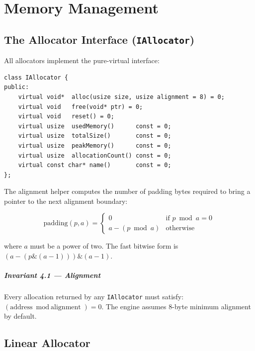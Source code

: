 \chapter{Memory Management}

\section{The Allocator Interface (\texttt{IAllocator})}

All allocators implement the pure-virtual interface:

\begin{lstlisting}[caption={IAllocator interface}]
class IAllocator {
public:
    virtual void*  alloc(usize size, usize alignment = 8) = 0;
    virtual void   free(void* ptr) = 0;
    virtual void   reset() = 0;
    virtual usize  usedMemory()      const = 0;
    virtual usize  totalSize()       const = 0;
    virtual usize  peakMemory()      const = 0;
    virtual usize  allocationCount() const = 0;
    virtual const char* name()       const = 0;
};
\end{lstlisting}

The alignment helper computes the number of padding bytes required to
bring a pointer to the next alignment boundary:

\begin{equation}
\text{padding}(p, a) =
\begin{cases}
  0 & \text{if } p \bmod a = 0 \\
  a - (p \bmod a) & \text{otherwise}
\end{cases}
\end{equation}

where $a$ must be a power of two. The fast bitwise form is
$(a - (p \mathbin{\&} (a-1))) \mathbin{\&} (a-1)$.


\paragraph{Invariant 4.1 --- Alignment}

  Every allocation returned by any \texttt{IAllocator} must satisfy:
  $(\text{address} \bmod \text{alignment}) = 0$.
  The engine assumes 8-byte minimum alignment by default.



\section{Linear Allocator}

